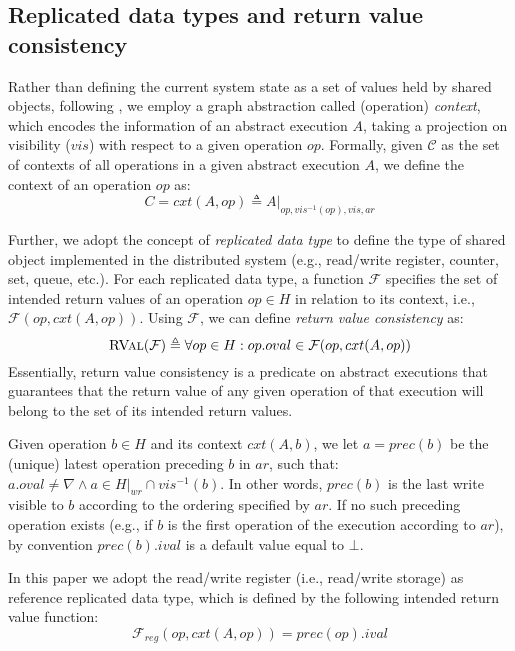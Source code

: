 \documentclass[letter, 11pt]{article}
\newcommand{\RVAL}{\textsc{RVal}(\mathcal{F})}
\newcommand{\citeN}{\citet}
\renewcommand{\cite}{\citep}
\newcommand{\A}{\ensuremath{A}}
\begin{document}
\subsection{Replicated data types and return value consistency}
Rather than defining the current system state as a set of values held by shared objects,
following \citeN{Burckhardt:14},
we employ a graph abstraction called (operation) \emph{context}, which
encodes the information 
of an abstract execution $\A$, taking a projection on visibility ($vis$) 
with respect to a given operation $op$.
Formally, given $\mathcal{C}$ as the set of contexts of all operations in a given abstract execution $\A$, we define the context of an operation $op$ as:
\begin{equation}
\label{eq:cxt}
C = cxt(\A,op) \triangleq \A|_{op,vis^{-1}(op),vis,ar}\end{equation}

Further, we adopt the concept of \emph{replicated data type} \cite{Burckhardt:14}
to define the type of shared object implemented in the distributed system
(e.g., read/write register, counter, set, queue, etc.).
For each replicated data type, a function $\mathcal{F}$ specifies 
the set of intended return values of an operation $op \in H$ in relation to 
its context, i.e.,  $\mathcal{F}(op, cxt(\A,op))$.
Using $\mathcal{F}$, we can define \emph{return value consistency} as:
\begin{equation} 
\RVAL \triangleq \forall op \in H : op.oval \in \mathcal{F}(op, cxt(\A,op))
\end{equation}
Essentially, return value consistency is a predicate on abstract executions that guarantees 
that the return value of any given operation of that execution will belong to the set of its intended return values.

Given operation $b\in H$ and its context $cxt(\A,b)$, 
we let $a = prec(b)$ be the (unique) latest operation preceding $b$
in $ar$, such that: $a.oval \neq \nabla \wedge a \in H|_{wr}\cap vis^{-1}(b)$. In other words, $prec(b)$ is the last write visible to $b$ according to the ordering specified by $ar$. 
If no such preceding operation exists (e.g., if $b$ is the first operation of the execution according to $ar$), 
by convention $prec(b).ival$ is a default value equal to $\bot$.

In this paper we adopt the read/write register (i.e., read/write storage) as reference replicated data type, 
which is defined by the following intended return value function:
\begin{equation}
\label{eq:Freg}
\mathcal{F}_{reg}(op, cxt(\A,op)) = prec(op).ival
\end{equation}
\end{document}
